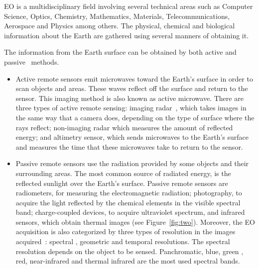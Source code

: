 \ac{EO} is a multidisciplinary field involving several technical areas such as
Computer Science, Optics,
Chemistry, Mathematics, Materials, Telecommunications, Aerospace and Physics among others. The physical, chemical and biological
information about the Earth are gathered using several manners of obtaining it.

The information from the Earth surface can be obtained by both active  and
passive~\cite{NASA} methods.
\begin{itemize}
\item Active remote sensors emit microwaves toward the Earth's
surface in order to scan objects and areas. These waves reflect off the surface and return to the sensor. This imaging
method is also known as active microwave. There are three types of active remote
sensing: imaging radar~\cite{NSIDC}, which takes images in the same way that a
camera does, depending on the type of
surface where the rays reflect; non-imaging radar which measures the amount of reflected energy; and altimetry
sensor, which sends microwaves to the Earth's surface and measures the time that these
microwaves take to return to the sensor.\\
\item Passive remote sensors use the radiation provided by some objects and
  their surrounding areas. The most common source of radiated energy, is the reflected
sunlight over the Earth's surface. Passive remote sensors are radiometers, for
measuring the electromagnetic radiation; photography, to acquire the light
reflected by the chemical elements in the visible spectral band; charge-coupled
devices, to acquire ultraviolet spectrum, and infrared sensors, which obtain thermal
images (see Figure~\ref{fig:two}). Moreover, the \ac{EO} acquisition is also categorized by three types of
resolution in the images acquired~\cite{Sandau2009}: spectral , geometric and temporal
resolutions. The spectral resolution depends on the object to be
sensed. Panchromatic, blue, green , red, near-infrared and thermal infrared are the
most used spectral bands.
\end{itemize}


\begin{figure*}
\begin{center}
 \hspace{0.05\textwidth}
\caption{Different images acquired by \acs{USGS}/\acs{NASA} Landsat.}
\label{fig:two}
\end{center}
\end{figure*}

